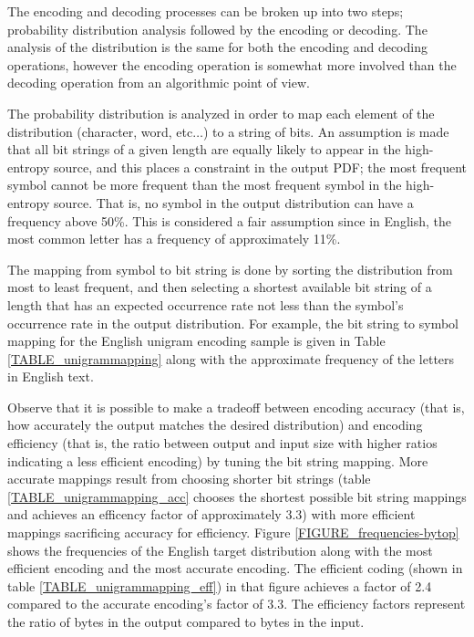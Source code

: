 \documentclass[12pt]{report}
\theoremstyle{remark}
\theoremstyle{definition}
\theoremstyle{definition}
\theoremstyle{definition}
\begin{document}
\begin{appendices}
The encoding and decoding processes can be broken up into two steps; probability
distribution analysis followed by the encoding or decoding. The analysis of the
distribution is the same for both the encoding and decoding operations, however
the encoding operation is somewhat more involved than the decoding operation
from an algorithmic point of view.

The probability distribution is analyzed in order to map each element of the
distribution (character, word, etc$\ldots$) to a string of bits. An assumption
is made that all bit strings of a given length are equally likely to appear in
the high-entropy source, and this places a constraint in the output PDF; the
most frequent symbol cannot be more frequent than the most frequent symbol in
the high-entropy source. That is, no symbol in the output distribution can have
a frequency above 50\%. This is considered a fair assumption since in English,
the most common letter has a frequency of approximately 11\%.

The mapping from symbol to bit string is done by sorting the distribution from
most to least frequent, and then selecting a shortest available bit string of a
length that has an expected occurrence rate not less than the symbol's
occurrence rate in the output distribution. For example, the bit string to
symbol mapping for the English unigram encoding sample is given in Table
\ref{TABLE_unigrammapping} along with the approximate frequency of the letters
in English text.

Observe that it is possible to make a tradeoff between encoding accuracy (that
is, how accurately the output matches the desired distribution) and encoding
efficiency (that is, the ratio between output and input size with higher ratios
indicating a less efficient encoding) by tuning the bit string mapping. More
accurate mappings result from choosing shorter bit strings (table
\ref{TABLE_unigrammapping_acc} chooses the shortest possible bit string mappings and
achieves an efficency factor of approximately 3.3) with more efficient mappings
sacrificing accuracy for efficiency. Figure \ref{FIGURE_frequencies-bytop} shows
the frequencies of the English target distribution along with the most efficient
encoding and the most accurate encoding. The efficient coding (shown in table \ref{TABLE_unigrammapping_eff}) in that figure
achieves a factor of 2.4 compared to the accurate encoding's factor of 3.3.
The efficiency factors represent the ratio of bytes in the output compared to
bytes in the input.


\end{appendices}
\end{document}
